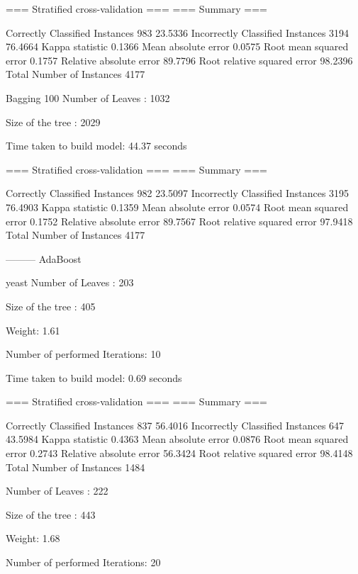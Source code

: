 === Stratified cross-validation ===
=== Summary ===

Correctly Classified Instances         983               23.5336 %
Incorrectly Classified Instances      3194               76.4664 %
Kappa statistic                          0.1366
Mean absolute error                      0.0575
Root mean squared error                  0.1757
Relative absolute error                 89.7796 %
Root relative squared error             98.2396 %
Total Number of Instances             4177


Bagging 100
Number of Leaves  : 	1032

Size of the tree : 	2029




Time taken to build model: 44.37 seconds

=== Stratified cross-validation ===
=== Summary ===

Correctly Classified Instances         982               23.5097 %
Incorrectly Classified Instances      3195               76.4903 %
Kappa statistic                          0.1359
Mean absolute error                      0.0574
Root mean squared error                  0.1752
Relative absolute error                 89.7567 %
Root relative squared error             97.9418 %
Total Number of Instances             4177


--------- AdaBoost

yeast 
Number of Leaves  : 	203

Size of the tree : 	405


Weight: 1.61

Number of performed Iterations: 10


Time taken to build model: 0.69 seconds

=== Stratified cross-validation ===
=== Summary ===

Correctly Classified Instances         837               56.4016 %
Incorrectly Classified Instances       647               43.5984 %
Kappa statistic                          0.4363
Mean absolute error                      0.0876
Root mean squared error                  0.2743
Relative absolute error                 56.3424 %
Root relative squared error             98.4148 %
Total Number of Instances             1484


Number of Leaves  : 	222

Size of the tree : 	443


Weight: 1.68

Number of performed Iterations: 20


